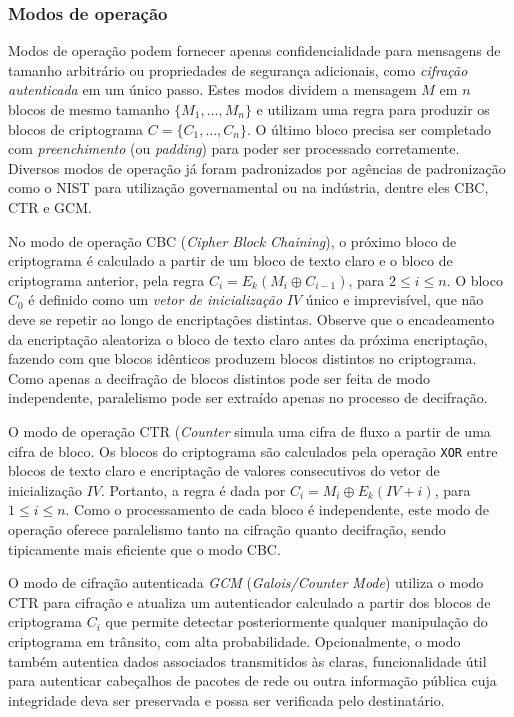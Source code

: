 \subsubsection*{Modos de operação}

Modos de operação podem fornecer apenas confidencialidade para mensagens de tamanho arbitrário ou propriedades de segurança adicionais, como \emph{cifração autenticada} em um único passo. Estes modos dividem a mensagem $M$ em $n$ blocos de mesmo tamanho $\{M_1, \ldots, M_n\}$ e utilizam uma regra para produzir os blocos de criptograma $C = \{C_1, \ldots, C_n\}$.
O último bloco precisa ser completado com \emph{preenchimento} (ou \emph{padding}) para poder ser processado corretamente.
Diversos modos de operação já foram padronizados por agências de padronização como o NIST para utilização governamental ou na indústria, dentre eles CBC, CTR e GCM.

No modo de operação CBC (\emph{Cipher Block Chaining}), o próximo bloco de criptograma é calculado a partir de um bloco de texto claro e o bloco de criptograma anterior, pela regra $C_i = E_k(M_i \oplus C_{i-1})$, para $2 \leq i \leq n$. O bloco $C_0$ é definido como um \emph{vetor de inicialização} $IV$ único e imprevisível, que não deve se repetir ao longo de encriptações distintas. Observe que o encadeamento da encriptação aleatoriza o bloco de texto claro antes da próxima encriptação, fazendo com que blocos idênticos produzem blocos distintos no criptograma. Como apenas a decifração de blocos distintos pode ser feita de modo independente, paralelismo pode ser extraído apenas no processo de decifração.

O modo de operação CTR (\emph{Counter} simula uma cifra de fluxo a partir de uma cifra de bloco. Os blocos do criptograma são calculados pela operação \texttt{XOR} entre blocos de texto claro e encriptação de valores consecutivos do vetor de inicialização $IV$. Portanto, a regra é dada por $C_i = M_i \oplus E_k(IV + i)$, para $1 \leq i \leq n$. Como o processamento de cada bloco é independente, este modo de operação oferece paralelismo tanto na cifração quanto decifração, sendo tipicamente mais eficiente que o modo CBC.

O modo de cifração autenticada \emph{GCM} (\emph{Galois/Counter Mode}) utiliza o modo CTR para cifração e atualiza um autenticador calculado a partir dos blocos de criptograma $C_i$ que permite detectar posteriormente qualquer manipulação do criptograma em trânsito, com alta probabilidade. Opcionalmente, o modo também autentica dados associados transmitidos às claras, funcionalidade útil para autenticar cabeçalhos de pacotes de rede ou outra informação pública cuja integridade deva ser preservada e possa ser verificada pelo destinatário.

